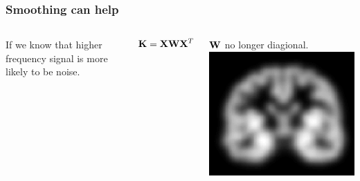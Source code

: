 \begin{frame}
\frametitle{Smoothing can help}
\begin{columns}[c]
If we know that higher frequency signal is more likely to be noise.\par
\begin{Large}
\begin{eqnarray*}
{\bf K} = {\bf X}{\bf W}{\bf X}^T
\end{eqnarray*}
\end{Large}

${\bf W}$ no longer diagional.
\includegraphics[width=\textwidth]{brain-GM-smo}
\end{columns}
\end{frame}


%
%

